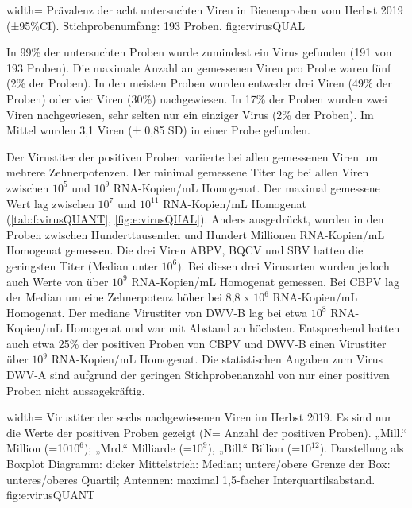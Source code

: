   {width=\textwidth} %
  {Prävalenz der acht untersuchten Viren in Bienenproben vom Herbst 2019 (±95\%CI). Stichprobenumfang: 193 Proben.} %
  {} %
  {fig:e:virusQUAL} %

In 99\% der untersuchten Proben wurde zumindest ein Virus gefunden (191 von 193 Proben). Die maximale Anzahl an gemessenen Viren pro Probe waren fünf (2\% der Proben). In den meisten Proben wurden entweder drei Viren (49\% der Proben) oder vier Viren (30\%) nachgewiesen. In 17\% der Proben wurden zwei Viren nachgewiesen, sehr selten nur ein einziger Virus (2\% der Proben). Im Mittel wurden 3,1 Viren (± 0,85 SD) in einer Probe gefunden.



Der Virustiter der positiven Proben variierte bei allen gemessenen Viren um mehrere Zehnerpotenzen. Der minimal gemessene Titer lag bei allen Viren zwischen $10^5$ und $10^9$ RNA-Kopien/\si{\milli\liter} Homogenat. Der maximal gemessene Wert lag zwischen $10^7$ und $10^{11}$ RNA-Kopien/\si{\milli\liter} Homogenat (\cref{tab:f:virusQUANT}, \cref{fig:e:virusQUAL}). Anders ausgedrückt, wurden in den Proben zwischen Hunderttausenden und Hundert Millionen RNA-Kopien/\si{\milli\liter} Homogenat gemessen. Die drei Viren ABPV, BQCV und SBV hatten die geringsten Titer (Median unter $10^6$). Bei diesen drei Virusarten wurden jedoch auch Werte von über $10^9$ RNA-Kopien/\si{\milli\liter} Homogenat gemessen. Bei CBPV lag der Median um eine Zehnerpotenz höher bei 8,8 x $10^6$ RNA-Kopien/\si{\milli\liter} Homogenat. Der mediane Virustiter von DWV-B lag bei etwa $10^8$ RNA-Kopien/\si{\milli\liter} Homogenat und war mit Abstand an höchsten. Entsprechend hatten auch etwa 25\% der positiven Proben von CBPV und DWV-B einen Virustiter über $10^9$ RNA-Kopien/\si{\milli\liter} Homogenat. Die statistischen Angaben zum Virus DWV-A sind aufgrund der geringen Stichprobenanzahl von nur einer positiven Proben nicht aussagekräftig.


  {width=\textwidth} %
  {Virustiter der sechs nachgewiesenen Viren im Herbst 2019. Es sind nur die Werte der positiven Proben gezeigt (N= Anzahl der positiven Proben). „Mill.“ Million (=10$10^6$); „Mrd.“ Milliarde (=$10^9$), „Bill.“ Billion (=$10^{12}$). Darstellung als Boxplot Diagramm: dicker Mittelstrich: Median; untere/obere Grenze der Box: unteres/oberes Quartil; Antennen: maximal 1,5-facher Interquartilsabstand.} %
  {} %
  {fig:e:virusQUANT} %


